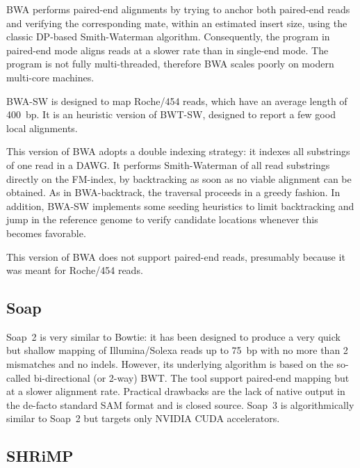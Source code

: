 BWA performs paired-end alignments by trying to anchor both paired-end reads and verifying the corresponding mate, within an estimated insert size, using the classic DP-based Smith-Waterman algorithm.
Consequently, the program in paired-end mode aligns reads at a slower rate than in single-end mode.
The program is not fully multi-threaded, therefore BWA scales poorly on modern multi-core machines.

BWA-SW \citep{BWA-SW} is designed to map Roche/454 reads, which have an average length of 400~bp.
It is an heuristic version of BWT-SW, designed to report a few good local alignments.

This version of BWA adopts a double indexing strategy: it indexes all substrings of one read in a DAWG.
It performs Smith-Waterman of all read substrings directly on the FM-index, by backtracking as soon as no viable alignment can be obtained.
As in BWA-backtrack, the traversal proceeds in a greedy fashion.
In addition, BWA-SW implements some seeding heuristics to limit backtracking and jump in the reference genome to verify candidate locations whenever this becomes favorable.

This version of BWA does not support paired-end reads, presumably because it was meant for Roche/454 reads.


\subsection{Soap}

Soap~2 \citep{Soap2} is very similar to Bowtie: it has been designed to produce a very quick but shallow mapping of Illumina/Solexa reads up to 75~bp with no more than 2 mismatches and no indels.
However, its underlying algorithm is based on the so-called bi-directional (or 2-way) BWT.
The tool support paired-end mapping but at a slower alignment rate.
Practical drawbacks are the lack of native output in the de-facto standard SAM format and is closed source.
Soap~3 \citep{Soap3} is algorithmically similar to Soap~2 but targets only NVIDIA CUDA accelerators.


\subsection{SHRiMP}

